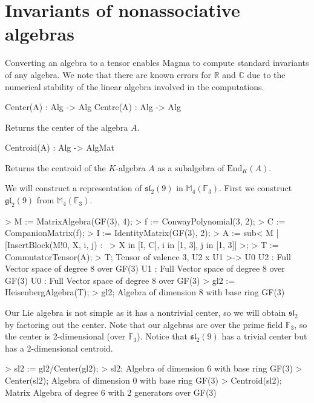 
\section{Invariants of nonassociative algebras}

Converting an algebra to a tensor enables Magma to compute standard invariants
of any algebra. We note that there are known errors for $\mathbb{R}$ and
$\mathbb{C}$ due to the numerical stability of the linear algebra involved in
the computations.

\begin{intrinsics}
Center(A) : Alg -> Alg
Centre(A) : Alg -> Alg
\end{intrinsics}

Returns the center of the algebra $A$.

\begin{intrinsics}
Centroid(A) : Alg -> AlgMat
\end{intrinsics}

Returns the centroid of the $K$-algebra $A$ as a subalgebra of $\text{End}_K(A)$.

\begin{example}[CenterCentroids]

We will construct a representation of $\mathfrak{sl}_2(9)$ in $\mathbb{M}_4(\mathbb{F}_3)$.
First we construct $\mathfrak{gl}_2(9)$ from $\mathbb{M}_4(\mathbb{F}_3)$.
\begin{code}
> M := MatrixAlgebra(GF(3), 4);
> f := ConwayPolynomial(3, 2);
> C := CompanionMatrix(f);
> I := IdentityMatrix(GF(3), 2);
> A := sub< M | [InsertBlock(M!0, X, i, j) : \
>     X in [I, C], i in [1, 3], j in [1, 3]] >;
> T := CommutatorTensor(A);
> T;
Tensor of valence 3, U2 x U1 >-> U0
U2 : Full Vector space of degree 8 over GF(3)
U1 : Full Vector space of degree 8 over GF(3)
U0 : Full Vector space of degree 8 over GF(3)
> gl2 := HeisenbergAlgebra(T);
> gl2;
Algebra of dimension 8 with base ring GF(3)
\end{code}

Our Lie algebra is not simple as it has a nontrivial center, so we will obtain
$\mathfrak{sl}_2$ by factoring out the center. Note that our algebras are over
the prime field $\mathbb{F}_3$, so the center is 2-dimensional (over
$\mathbb{F}_3$). Notice that $\mathfrak{sl}_2(9)$ has a trivial center but has a
2-dimensional centroid.
\begin{code}
> sl2 := gl2/Center(gl2);
> sl2;
Algebra of dimension 6 with base ring GF(3)
> Center(sl2);
Algebra of dimension 0 with base ring GF(3)
> Centroid(sl2);
Matrix Algebra of degree 6 with 2 generators over GF(3)
\end{code}
\end{example}

